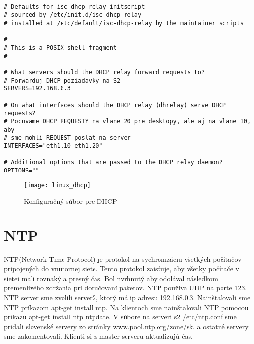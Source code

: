 \noindent
{\selectfont

\begin{small}

\begin{verbatim}

# Defaults for isc-dhcp-relay initscript
# sourced by /etc/init.d/isc-dhcp-relay
# installed at /etc/default/isc-dhcp-relay by the maintainer scripts

#
# This is a POSIX shell fragment
#

# What servers should the DHCP relay forward requests to?
# Forwarduj DHCP poziadavky na S2
SERVERS=192.168.0.3

# On what interfaces should the DHCP relay (dhrelay) serve DHCP requests?
# Pocuvame DHCP REQUESTY na vlane 20 pre desktopy, ale aj na vlane 10, aby 
# sme mohli REQUEST poslat na server
INTERFACES="eth1.10 eth1.20"

# Additional options that are passed to the DHCP relay daemon?
OPTIONS=""

\end{verbatim}

\end{small}

}

\begin{figure}[!htb]
\centering
\texttt{[image: linux\_dhcp]}
\caption{Konfiguračný súbor pre DHCP}
\label{fig:x dhcp_config}
\end{figure}

\section{NTP}
\paragraph{}
NTP(Network Time Protocol) je protokol na sychronizáciu všetkých počítačov pripojených do vnutornej siete. Tento protokol zaisťuje, aby všetky počítače v sietei mali rovnaký a presný čas. Bol nvrhnutý aby odolával následkom premenlivého zdržania pri doručovaní paketov. NTP používa UDP na porte 123. NTP server sme zvolili server2, ktorý má ip adresu 192.168.0.3. Nainštalovali sme NTP príkazom apt-get install ntp. Na klientoch sme nainštalovali NTP pomocou príkazu apt-get install ntp ntpdate. V súbore na serveri s2 /etc/ntp.conf sme pridali slovenské servery zo stránky www.pool.ntp.org/zone/sk. a ostatné servery sme zakomentovali. Klienti si z master serveru aktualizujú čas.


